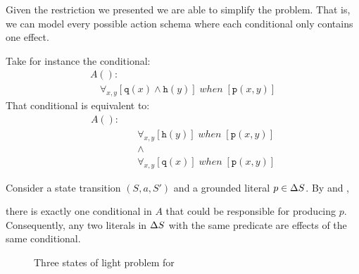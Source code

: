\documentclass[\master/Master.tex]{subfiles}
\begin{document}
Given the restriction we presented we are able to simplify the problem. That is, we can model every possible action schema where each conditional only contains one effect.

\begin{example}
	Take for instance the conditional:	
	\begin{align*}
		&A():&  \\
		&\quad
		\forall_{x, y}
			\left[
				\texttt{q}(x) \land \texttt{h}(y)
			\right]
		\; when \;
		\left[ \texttt{p}(x,y) \right]
	\end{align*}		
	That conditional is equivalent to: 
	\begin{align*}
		A():&  \\
			 &\quad\forall_{x, y}
				\left[
				\texttt{h}(y)
				\right]
				\; when \;
				\left[ \texttt{p}(x,y) \right] \\
		&\quad\land 	\\		
		&\quad\forall_{x, y}
		\left[
		\texttt{q}(x)
		\right]
		\; when \;
		\left[ \texttt{p}(x,y) \right]
	\end{align*}
	
\end{example}



\begin{proposition}\label{prop:ca:singleConditional}
    Consider a state transition $\left(S, a, S'\right)$ and a grounded literal $p \in \Delta S$. By  and , 
    
    there is exactly one conditional in $A$ that could be responsible for producing $p$. Consequently, any two literals in $\Delta S$ with the same predicate are effects of the same conditional.
\end{proposition}

\begin{figure}
	\caption{\label{fig:ca:house-example}Three states of light problem for }
\end{figure}
\end{document}
